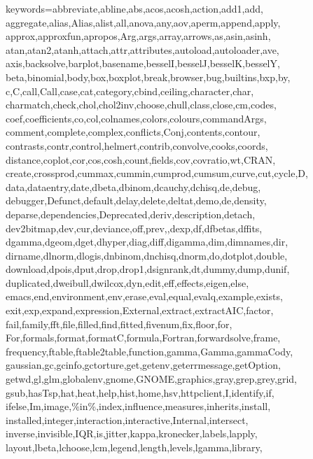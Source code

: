 \def\zz{\ifx\[$\else\aftergroup\zzz\fi}
\def\zzz{\setbox0\lastbox
	\dimen0\dimexpr\extrarowheight + \ht0-\dp0\relax
	\setbox0\hbox{\raise-.5\dimen0\box0}%
	\ht0=\dimexpr\ht0+\extrarowheight\relax
	\dp0=\dimexpr\dp0+\extrarowheight\relax
	\box0
}

%
{keywords={abbreviate,abline,abs,acos,acosh,action,add1,add,%
		aggregate,alias,Alias,alist,all,anova,any,aov,aperm,append,apply,%
		approx,approxfun,apropos,Arg,args,array,arrows,as,asin,asinh,%
		atan,atan2,atanh,attach,attr,attributes,autoload,autoloader,ave,%
		axis,backsolve,barplot,basename,besselI,besselJ,besselK,besselY,%
		beta,binomial,body,box,boxplot,break,browser,bug,builtins,bxp,by,%
		c,C,call,Call,case,cat,category,cbind,ceiling,character,char,%
		charmatch,check,chol,chol2inv,choose,chull,class,close,cm,codes,%
		coef,coefficients,co,col,colnames,colors,colours,commandArgs,%
		comment,complete,complex,conflicts,Conj,contents,contour,%
		contrasts,contr,control,helmert,contrib,convolve,cooks,coords,%
		distance,coplot,cor,cos,cosh,count,fields,cov,covratio,wt,CRAN,%
		create,crossprod,cummax,cummin,cumprod,cumsum,curve,cut,cycle,D,%
		data,dataentry,date,dbeta,dbinom,dcauchy,dchisq,de,debug,%
		debugger,Defunct,default,delay,delete,deltat,demo,de,density,%
		deparse,dependencies,Deprecated,deriv,description,detach,%
		dev2bitmap,dev,cur,deviance,off,prev,,dexp,df,dfbetas,dffits,%
		dgamma,dgeom,dget,dhyper,diag,diff,digamma,dim,dimnames,dir,%
		dirname,dlnorm,dlogis,dnbinom,dnchisq,dnorm,do,dotplot,double,%
		download,dpois,dput,drop,drop1,dsignrank,dt,dummy,dump,dunif,%
		duplicated,dweibull,dwilcox,dyn,edit,eff,effects,eigen,else,%
		emacs,end,environment,env,erase,eval,equal,evalq,example,exists,%
		exit,exp,expand,expression,External,extract,extractAIC,factor,%
		fail,family,fft,file,filled,find,fitted,fivenum,fix,floor,for,%
		For,formals,format,formatC,formula,Fortran,forwardsolve,frame,%
		frequency,ftable,ftable2table,function,gamma,Gamma,gammaCody,%
		gaussian,gc,gcinfo,gctorture,get,getenv,geterrmessage,getOption,%
		getwd,gl,glm,globalenv,gnome,GNOME,graphics,gray,grep,grey,grid,%
		gsub,hasTsp,hat,heat,help,hist,home,hsv,httpclient,I,identify,if,%
		ifelse,Im,image,\%in\%,index,influence,measures,inherits,install,%
		installed,integer,interaction,interactive,Internal,intersect,%
		inverse,invisible,IQR,is,jitter,kappa,kronecker,labels,lapply,%
		layout,lbeta,lchoose,lcm,legend,length,levels,lgamma,library,%
}}
